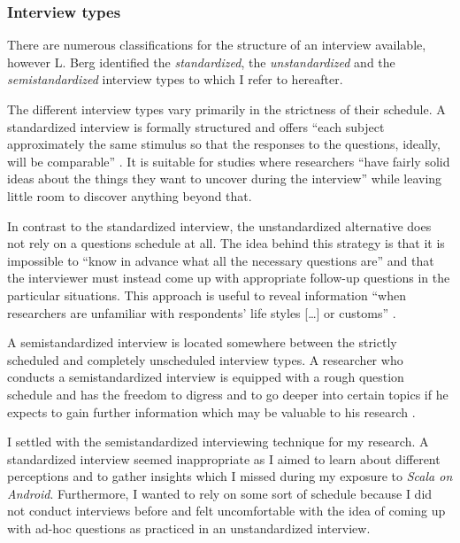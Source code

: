 \subsubsection{Interview types}

There are numerous classifications for the structure of an interview available, however L. Berg identified the \textit{standardized}, the \textit{unstandardized} and the \textit{semistandardized} interview types \cite[p. 68]{berg01} to which I refer to hereafter.

The different interview types vary primarily in the strictness of their schedule. A standardized interview is formally structured and offers \enquote{each subject approximately the same stimulus so that the responses to the questions, ideally, will be comparable} \cite[p. 69]{berg01}. It is suitable for studies where researchers \enquote{have fairly solid ideas about the things they want to uncover during the interview} \cite[p. 69]{berg01} while leaving little room to discover anything beyond that.

In contrast to the standardized interview, the unstandardized alternative does not rely on a questions schedule at all. The idea behind this strategy is that it is impossible to \enquote{know in advance what all the necessary questions are} \cite[p. 70]{berg01} and that the interviewer must instead come up with appropriate follow-up questions in the particular situations. This approach is useful to reveal information \enquote{when researchers are unfamiliar with respondents' life styles […] or customs} \cite[p. 70]{berg01}.

A semistandardized interview is located somewhere between the strictly scheduled and completely unscheduled interview types. A researcher who conducts a semistandardized interview is equipped with a rough question schedule and has the freedom to digress and to go deeper into certain topics if he expects to gain further information which may be valuable to his research \cite[p. 70]{berg01}.

I settled with the semistandardized interviewing technique for my research. A standardized interview seemed inappropriate as I aimed to learn about different perceptions and to gather insights which I missed during my exposure to \textit{Scala on Android}. Furthermore, I wanted to rely on some sort of schedule because I did not conduct interviews before and felt uncomfortable with the idea of coming up with ad-hoc questions as practiced in an unstandardized interview.


